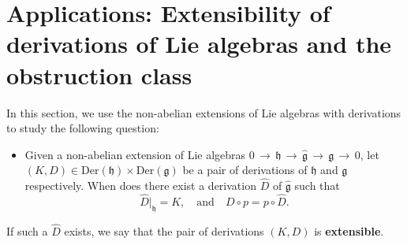 \documentclass[12pt]{amsart}
\newcommand{\lon }{\,\rightarrow\,}
\newcommand{\g}{\mathfrak g}
\newcommand{\h}{\mathfrak h}
\newcommand{\Der}{\mathrm{Der}}
\begin{document}
\section{Applications: Extensibility of derivations of Lie algebras and the obstruction class}
In this section, we use the non-abelian extensions of Lie algebras with derivations to study the following question: 
\begin{itemize}
    \item
Given a non-abelian extension of Lie algebras $0\lon\h\lon\hat{\g}\lon\g\lon0$, let $(K,D)\in\Der(\h)\times\Der(\g)$ be a pair of derivations of $\h$ and $\g$ respectively. When does there exist a derivation $\hat{D}$ of $\hat{\g}$ such that $$\hat{D}|_\h=K, \quad \text{and}\quad  D\circ p=p\circ\hat{D}.$$ 
\end{itemize}
If such a $\hat{D}$ exists, we say that the pair of derivations $(K,D)$  is {\bf extensible}. 
\end{document}
